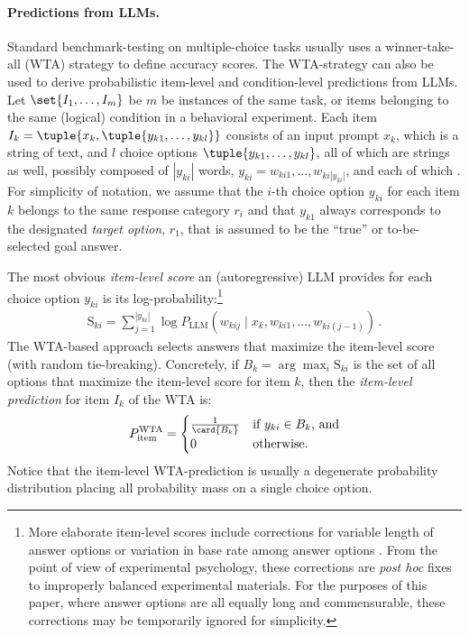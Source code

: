 \documentclass[fleqn]{article}
\begin{document}
\paragraph{Predictions from LLMs.}
Standard benchmark-testing on multiple-choice tasks usually uses a winner-take-all (WTA) strategy \citep[e.g.,][]{srivastava2023-BIGbench} to define accuracy scores.
The WTA-strategy can also be used to derive probabilistic item-level and condition-level predictions from LLMs.
Let $\set{I_{1}, \dots, I_{m}}$ be $m$ be instances of the same task, or items belonging to the same (logical) condition in a behavioral experiment.
Each item $I_{k} = \tuple{x_{k}, \tuple{y_{k1}, \dots, y_{kl}}}$ consists of an input prompt $x_{k}$, which is a string of text, and $l$ choice options $\tuple{y_{k1}, \dots, y_{kl}}$, all of which are strings as well, possibly composed of $|y_{ki}|$ words, $y_{ki} = w_{ki1}, \dots, w_{ki|y_{ki}|}$, and each of which .
For simplicity of notation, we assume that the $i$-th choice option $y_{ki}$ for each item $k$ belongs to the same response category $r_{i}$ and that $y_{k1}$ always corresponds to the designated \emph{target option}, $r_{1}$, that is assumed to be the ``true'' or to-be-selected goal answer.

The most obvious \emph{item-level score} an (autoregressive) LLM provides for each choice option $y_{ki}$ is its log-probability:\footnote{
  More elaborate item-level scores include corrections for variable length of answer options \citep[e.g.,][]{BrownMann2020:Language-Models} or variation in base rate among answer options \citep[e.g.,][]{HoltzmanWest2021:Surface-Form-Co}.
  From the point of view of experimental psychology, these corrections are \emph{post hoc} fixes to improperly balanced experimental materials.
  For the purposes of this paper, where answer options are all equally long and commensurable, these corrections may be temporarily ignored for simplicity.
}
%
\begin{align*}
  \text{S}_{ki}
  =  \sum_{j=1}^{|y_{ki}|} \log P_{\text{LLM}} \left(w_{kij} \mid x_{k}, w_{ki1}, \dots, w_{ki(j-1)} \right)  \,.
\end{align*}
%
The WTA-based approach selects answers that maximize the item-level score (with random tie-breaking).
Concretely, if $B_{k} = \arg \max_{i} \text{S}_{ki}$ is the set of all options that maximize the item-level score for item $k$, then the \emph{item-level prediction} for item $I_{k}$ of the WTA is:
%
\begin{align*}
  P_{\text{item}}^{\text{WTA}} =
  \begin{cases}
    \frac{1}{\card{B_{k}}} & \text{if } y_{ki} \in B_{k} \text{, and} \\
    0                     & \text{otherwise.}
  \end{cases}
\end{align*}
%
Notice that the item-level WTA-prediction is usually a degenerate probability distribution placing all probability mass on a single choice option.
\end{document}
